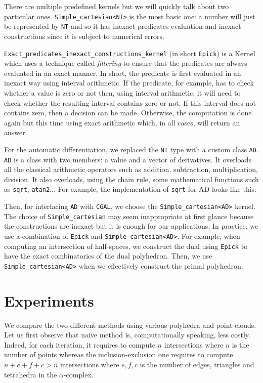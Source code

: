 There are multiple predefined kernels but we will quickly talk about two
particular ones. \texttt{Simple\_cartesian<NT>} is the most basic one: a number
will just be represented by \texttt{NT} and so it has inexact predicates
evaluation and inexact constructions since it is subject to numerical errors.

\texttt{Exact\_predicates\_inexact\_constructions\_kernel} (in short
\texttt{Epick}) is a Kernel which uses a technique called \emph{filtering} to
ensure that the predicates are always evaluated in an exact manner. In short,
the predicate is first evaluated in an inexact way using interval arithmetic.
If the predicate, for example, has to check whether a value is zero or not then,
using interval arithmetic, it will need to check whether the resulting interval
contains zero or not. If this interval does not contains zero, then a decision
can be made. Otherwise, the computation is done again but this time using exact
arithmetic which, in all cases, will return an answer.

For the automatic differentiation, we replaced the \texttt{NT} type with a
custom class \texttt{AD}. \texttt{AD} is a class with two members: a value and a
vector of derivatives. It overloads all the classical arithmetic operators such
as addition, subtraction, multiplication, division. It also overloads, using the
chain rule, some mathematical functions such as \texttt{sqrt}, \texttt{atan2}...
For example, the implementation of \texttt{sqrt} for AD looks like this:


Then, for interfacing \texttt{AD} with \texttt{CGAL}, we choose the
\texttt{Simple\_cartesian<AD>} kernel. The choice of \texttt{Simple\_cartesian}
may seem inappropriate at first glance because the constructions are inexact but
it is enough for our applications. In practice, we use a combination of
\texttt{Epick} and \texttt{Simple\_cartesian<AD>}. For example, when computing
an intersection of half-spaces, we construct the dual using \texttt{Epick} to
have the exact combinatorics of the dual polyhedron. Then, we use
\texttt{Simple\_cartesian<AD>} when we effectively construct the primal
polyhedron.

\section{Experiments}

We compare the two different methods using various polyhedra and point clouds.
Let us first observe that naive method is, computationally speaking, less
costly. Indeed, for each iteration, it requires to compute $ n $ intersections
where $ n $ is the number of points whereas the inclusion-exclusion one requires
to compute $ n + e + f + c > n $ intersections where $ e, f, c $ is the number
of edges, triangles and tetrahedra in the $ \alpha $-complex.

